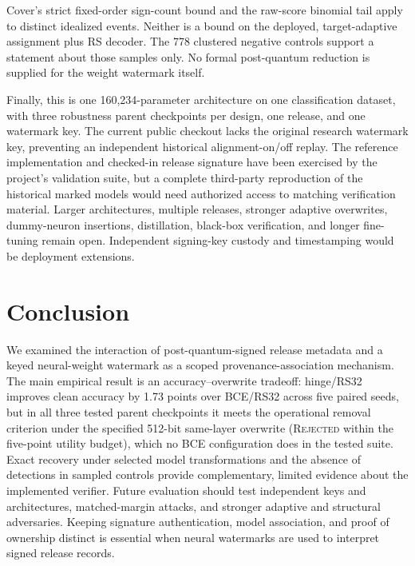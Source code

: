 \documentclass[conference]{IEEEtran}
\begin{document}
Cover's strict fixed-order sign-count bound and the raw-score binomial tail
apply to distinct idealized events. Neither is a bound on the deployed,
target-adaptive assignment plus RS decoder. The 778 clustered negative
controls support a statement about those samples only. No formal
post-quantum reduction is supplied for the weight watermark itself.

Finally, this is one 160,234-parameter architecture on one classification
dataset, with three robustness parent checkpoints per design, one release,
and one watermark key. The current public checkout lacks the original
research watermark key, preventing an independent historical alignment-on/off
replay. The reference implementation and checked-in release signature have
been exercised by the project's validation suite, but a complete third-party
reproduction of the historical marked models would need authorized access
to matching verification material. Larger architectures, multiple releases,
stronger adaptive overwrites, dummy-neuron insertions, distillation,
black-box verification, and longer fine-tuning remain open. Independent
signing-key custody and timestamping would be deployment extensions.

\section{Conclusion}
\label{sec:conclusion}
We examined the interaction of post-quantum-signed release metadata and a
keyed neural-weight watermark as a scoped provenance-association mechanism.
The main empirical result is an accuracy--overwrite tradeoff: hinge/RS32
improves clean accuracy by 1.73 points over BCE/RS32 across five paired seeds,
but in all three tested parent checkpoints it meets the operational removal
criterion under the specified 512-bit same-layer overwrite (\textsc{Rejected}
within the five-point utility budget), which no BCE configuration does in the
tested suite. Exact recovery under selected model transformations and the
absence of detections in sampled controls provide complementary, limited
evidence about the implemented verifier. Future evaluation should test
independent keys and architectures, matched-margin attacks, and stronger
adaptive and structural adversaries. Keeping signature authentication, model
association, and proof of ownership distinct is essential when neural
watermarks are used to interpret signed release records.

\end{document}
